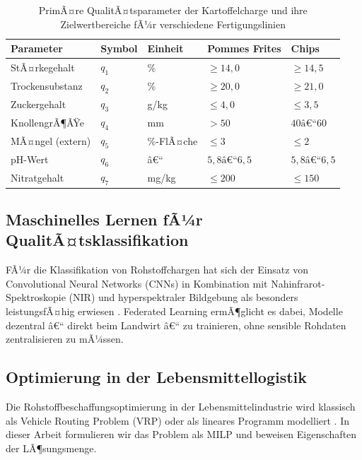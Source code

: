 ﻿\documentclass[12pt,a4paper]{article}
\theoremstyle{plain}
\theoremstyle{definition}
\begin{document}
	\begin{table}[H]
		\centering
		\caption{PrimÃ¤re QualitÃ¤tsparameter der Kartoffelcharge und ihre
			Zielwertbereiche fÃ¼r verschiedene Fertigungslinien}
		\label{tab:qualitaetsparameter}
		\begin{tabular}{@{}lllll@{}}
			\toprule
			\textbf{Parameter} & \textbf{Symbol} & \textbf{Einheit} &
			\textbf{Pommes Frites} & \textbf{Chips} \\
			\midrule
			StÃ¤rkegehalt        & $q_1$ & $\%$       & $\geq 14{,}0$ & $\geq 14{,}5$ \\
			Trockensubstanz     & $q_2$ & $\%$       & $\geq 20{,}0$ & $\geq 21{,}0$ \\
			Zuckergehalt        & $q_3$ & g/kg       & $\leq 4{,}0$  & $\leq 3{,}5$ \\
			KnollengrÃ¶ÃŸe        & $q_4$ & mm         & $> 50$        & $40\text{â€“}60$ \\
			MÃ¤ngel (extern)     & $q_5$ & $\%$-FlÃ¤che& $\leq 3$      & $\leq 2$ \\
			pH-Wert             & $q_6$ & â€“          & $5{,}8\text{â€“}6{,}5$ & $5{,}8\text{â€“}6{,}5$ \\
			Nitratgehalt        & $q_7$ & mg/kg      & $\leq 200$    & $\leq 150$ \\
			\bottomrule
		\end{tabular}
	\end{table}
	
	\subsection{Maschinelles Lernen fÃ¼r QualitÃ¤tsklassifikation}
	
	FÃ¼r die Klassifikation von Rohstoffchargen hat sich der Einsatz von
	Convolutional Neural Networks (CNNs) in Kombination mit Nahinfrarot-Spektroskopie
	(NIR) und hyperspektraler Bildgebung als besonders leistungsfÃ¤hig erwiesen
	\cite{elmasry2012,su2017,lu2020}. Federated Learning \cite{mcmahan2017}
	ermÃ¶glicht es dabei, Modelle dezentral â€“ direkt beim Landwirt â€“ zu trainieren,
	ohne sensible Rohdaten zentralisieren zu mÃ¼ssen.
	
	\subsection{Optimierung in der Lebensmittellogistik}
	
	Die Rohstoffbeschaffungsoptimierung in der Lebensmittelindustrie wird
	klassisch als Vehicle Routing Problem (VRP) oder als lineares Programm
	modelliert \cite{ahumada2009,shukla2019}. In dieser Arbeit formulieren
	wir das Problem als MILP und beweisen Eigenschaften der LÃ¶sungsmenge.
	
\end{document}
